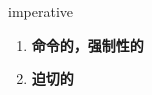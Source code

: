 
\begin{frame}
{\huge imperative}
\begin{center}
\begin{enumerate}\Large
  \item \textbf{命令的，强制性的}
  \item \textbf{迫切的}
\end{enumerate}
\end{center}
\end{frame}
